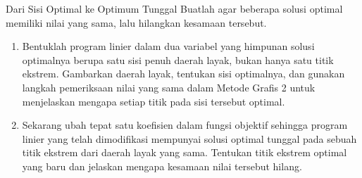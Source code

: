 \begin{ex}{Dari Sisi Optimal ke Optimum Tunggal}{}\label{ex:edge-of-optima}
Buatlah agar beberapa solusi optimal memiliki nilai yang sama, lalu hilangkan kesamaan tersebut.
\begin{enumerate}
\item Bentuklah program linier dalam dua variabel yang himpunan solusi optimalnya berupa satu sisi penuh daerah layak, bukan hanya satu titik ekstrem. Gambarkan daerah layak, tentukan sisi optimalnya, dan gunakan langkah pemeriksaan nilai yang sama dalam Metode Grafis 2 untuk menjelaskan mengapa setiap titik pada sisi tersebut optimal.
\item Sekarang ubah tepat satu koefisien dalam fungsi objektif sehingga program linier yang telah dimodifikasi mempunyai solusi optimal tunggal pada sebuah titik ekstrem dari daerah layak yang sama. Tentukan titik ekstrem optimal yang baru dan jelaskan mengapa kesamaan nilai tersebut hilang.
\end{enumerate}
\end{ex}

%

